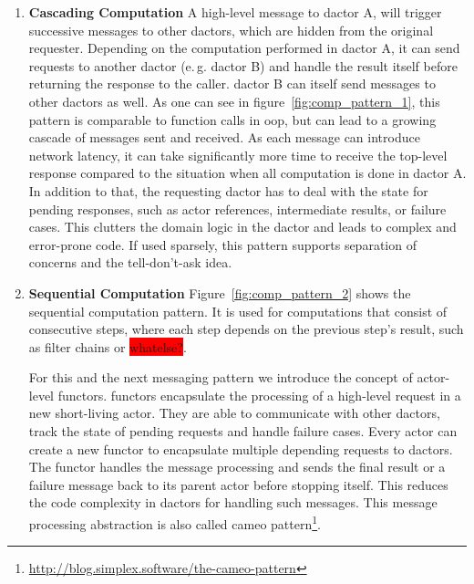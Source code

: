     \begin{enumerate}
      \item\label{enum:comp_pattern_1} \textbf{Cascading Computation}
        A high-level message to \gls{dactor} A, will trigger successive messages to other \glspl{dactor}, which are hidden from the original requester.
        Depending on the computation performed in \gls{dactor} A, it can send requests to another \gls{dactor} (e.\,g. \gls{dactor} B) and handle the result itself before returning the response to the caller.
        \gls{dactor} B can itself send messages to other \glspl{dactor} as well.
        As one can see in figure~\ref{fig:comp_pattern_1}, this pattern is comparable to function calls in \gls{oop}, but can lead to a growing cascade of messages sent and received.
        As each message can introduce network latency, it can take significantly more time to receive the top-level response compared to the situation when all computation is done in \gls{dactor} A.
        In addition to that, the requesting \gls{dactor} has to deal with the state for pending responses, such as actor references, intermediate results, or failure cases.
        This clutters the domain logic in the \gls{dactor} and leads to complex and error-prone code.
        If used sparsely, this pattern supports separation of concerns and the tell-don't-ask idea.

      \item\label{enum:comp_pattern_2} \textbf{Sequential Computation}
        Figure~\ref{fig:comp_pattern_2} shows the sequential computation pattern.
        It is used for computations that consist of consecutive steps, where each step depends on the previous step's result, such as filter chains or \colorbox{red}{whatelse?}.

        For this and the next messaging pattern we introduce the concept of actor-level \glspl{functor}.
        \glspl{functor} encapsulate the processing of a high-level request in a new short-living actor.
        They are able to communicate with other \glspl{dactor}, track the state of pending requests and handle failure cases.
        Every actor can create a new \gls{functor} to encapsulate multiple depending requests to \glspl{dactor}.
        The \gls{functor} handles the message processing and sends the final result or a failure message back to its parent actor before stopping itself.
        This reduces the code complexity in \glspl{dactor} for handling such messages.
        This message processing abstraction is also called cameo pattern\footnote{\url{http://blog.simplex.software/the-cameo-pattern}}.


\end{enumerate}
